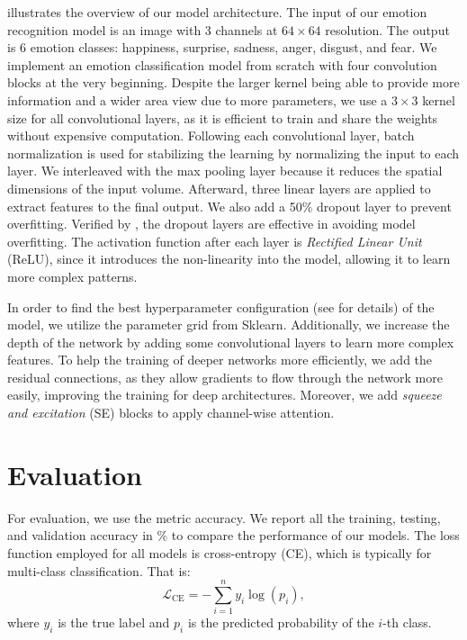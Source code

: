  illustrates the overview of our model architecture. 
The input of our emotion recognition model is an image with 3 channels at $64 \times 64 $ resolution. 
The output is 6 emotion classes: happiness, surprise, sadness, anger, disgust, and fear. 
We implement an emotion classification model from scratch with four convolution blocks at the very beginning. 
Despite the larger kernel being able to provide more information and a wider area view due to more parameters, 
we use a $3 \times 3$ kernel size for all convolutional layers, 
as it is efficient to train and share the weights without expensive computation. 
Following each convolutional layer, 
batch normalization is used for stabilizing the learning by normalizing the input to each layer. 
We interleaved with the max pooling layer because it reduces the spatial dimensions of the input volume. 
Afterward, three linear layers are applied to extract features to the final output. 
We also add a 50\% dropout layer to prevent overfitting. 
Verified by \citet{BarsoumZCZ16}, 
the dropout layers are effective in avoiding model overfitting. 
The activation function after each layer is \textit{Rectified Linear Unit} (ReLU), 
since it introduces the non-linearity into the model, 
allowing it to learn more complex patterns. 

In order to find the best hyperparameter configuration (see  for details) of the model, 
we utilize the parameter grid from Sklearn.
Additionally, we increase the depth of the network by adding some convolutional layers to learn more complex features. 
To help the training of deeper networks more efficiently, 
we add the residual connections, 
as they allow gradients to flow through the network more easily, improving the training for deep architectures. 
Moreover, 
we add \textit{squeeze and excitation} (SE) blocks to apply channel-wise attention. 

\section{Evaluation}
\label{sec:evaluation}

For evaluation, we use the metric accuracy. 
We report all the training, testing, and validation accuracy in \% to compare the performance of our models. 
The loss function employed for all models is cross-entropy (CE), which is typically for multi-class classification. 
That is:
\begin{equation}
  \mathcal{L}_{\text{CE}} = -\sum_{i=1}^{n} y_i \log(p_i),
\end{equation}
where $y_i$ is the true label and $p_i$ is the predicted probability of the $i$-th class.


